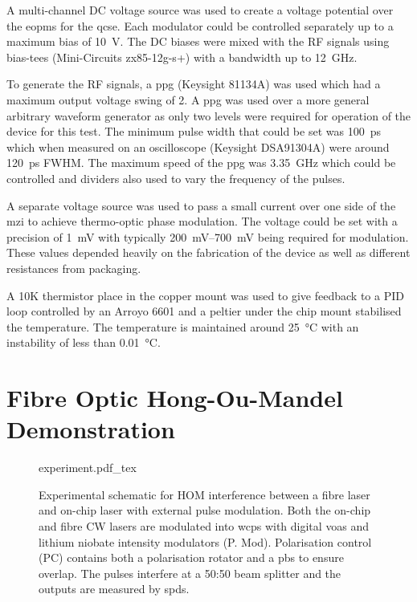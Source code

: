 A multi-channel DC voltage source was used to create a voltage potential over the \acp{eopm} for the \ac{qcse}. Each modulator could be controlled separately up to a maximum bias of \SI{10}{V}. The DC biases were mixed with the RF signals using bias-tees (Mini-Circuits zx85-12g-s+) with a bandwidth up to \SI{12}{GHz}. 

To generate the RF signals, a \ac{ppg} (Keysight 81134A) was used which had a maximum output voltage swing of \SI{2}{\Vpp}. A \ac{ppg} was used over a more general arbitrary waveform generator as only two levels were required for operation of the device for this test. The minimum pulse width that could be set was \SI{100}{\ps} which when measured on an oscilloscope (Keysight DSA91304A) were around \SI{120}{\ps} \ac{FWHM}. The maximum speed of the \ac{ppg} was \SI{3.35}{\GHz} which could be controlled and dividers also used to vary the frequency of the pulses. 

A separate voltage source was used to pass a small current over one side of the \ac{mzi} to achieve thermo-optic phase modulation. The voltage could be set with a precision of \SI{1}{\mV} with typically \SIrange{200}{700}{\mV} being required for modulation. These values depended heavily on the fabrication of the device as well as different resistances from packaging.

A 10K thermistor place in the copper mount was used to give feedback to a PID loop controlled by an Arroyo 6601 and a peltier under the chip mount stabilised the temperature. The temperature is maintained around \SI{25}{\celsius} with an instability of less than \SI{0.01}{\celsius}. 

\section{Fibre Optic Hong-Ou-Mandel Demonstration}

\begin{figure}[t]
	\centering
	\def\svgwidth{\textwidth} 
	{experiment.pdf_tex}
	\caption[Fibre-chip HOM experimental setup]{Experimental schematic for \ac{HOM} interference between a fibre laser and on-chip laser with external pulse modulation. Both the on-chip and fibre \ac{CW} lasers are modulated into \acp{wcp} with digital \acp{voa} and lithium niobate intensity modulators (P. Mod). Polarisation control (PC) contains both a polarisation rotator and a \ac{pbs} to ensure overlap. The pulses interfere at a {50:50} beam splitter and the outputs are measured by \acp{spd}.}
	\label{fig:fibre_chip_exp}
\end{figure}

